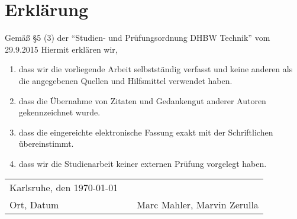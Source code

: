 \section*{Erklärung}
\vspace*{2em}
Gemäß \S 5 (3) der \enquote{Studien- und Prüfungsordnung DHBW Technik} vom 29.9.2015
Hiermit erklären wir, \\
\begin{enumerate}
\item dass wir die vorliegende Arbeit selbstständig verfasst und keine anderen als die
angegebenen Quellen und Hilfsmittel verwendet haben. 
\item dass die Übernahme von Zitaten und Gedankengut anderer Autoren gekennzeichnet wurde.
\item dass die eingereichte elektronische Fassung exakt mit der Schriftlichen übereinstimmt.
\item dass wir die Studienarbeit keiner externen Prüfung vorgelegt haben.
\end{enumerate}
\vspace{3em}
\begin{tabular}{lp{2em}l}
 Karlsruhe, den \today  && \hspace{7cm} \\\cline{1-1}\cline{3-3}
 Ort, Datum     &&  Marc Mahler, Marvin Zerulla
\end{tabular} 
\newpage